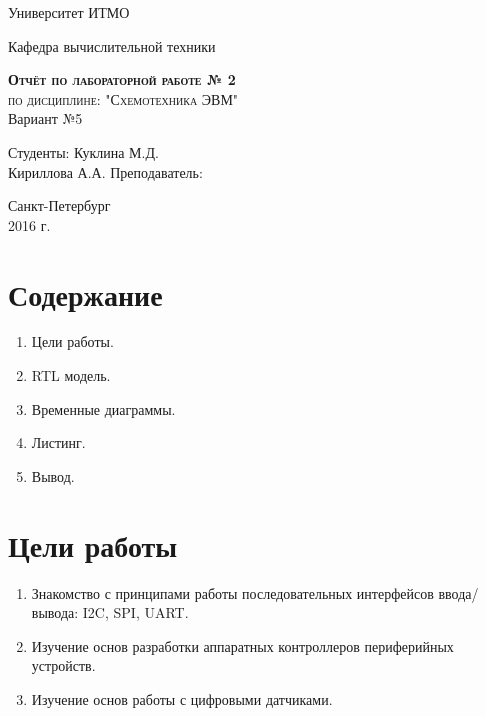 \documentclass[a4paper, 10pt]{article}
\begin{document}
    \begin{titlepage}
        \begin{center}
            \large
            Университет ИТМО
            \vspace{3cm}


            Кафедра вычислительной техники
            \vspace{4cm}

            \textsc{ \textbf{Отчёт по лабораторной работе  № 2} \\ 
            по дисциплине: "Схемотехника ЭВМ"}\\Вариант №5\\[8mm]

            \bigskip
        \end{center}
        \vspace{3cm}

        \hfill\begin{flushright}
             Студенты:
             Куклина М.Д. \\
             Кириллова А.А.
             \vfill
             Преподаватель:
        \end{flushright}
        \vfill
        \vfill
        \vfill
        \vfill
        \vfill
        \begin{center}
            Санкт-Петербург \\2016 г.
        \end{center}
    \end{titlepage}
   \newpage
    \section*{Содержание}
        \begin{enumerate}
            \item Цели работы.
            \item RTL модель.
            \item Временные диаграммы.
            \item Листинг.
            \item Вывод.
        \end{enumerate}

    \section*{Цели работы}
        \begin{enumerate}
            \item Знакомство с принципами работы последовательных интерфейсов ввода/вывода: I2C, SPI, UART.
            \item Изучение основ разработки аппаратных контроллеров периферийных устройств.
            \item  Изучение основ работы с цифровыми датчиками.
        \end{enumerate} 
\end{document}
